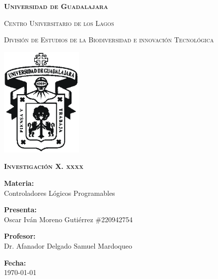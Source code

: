 \documentclass[12pt]{report}
\begin{document}
\setlength{\hoffset}{27 pt} %
\begin{titlepage}
{\centering
{\scshape\bfseries\fontsize{29.16}{34.992}\selectfont Universidad de Guadalajara \par}
\vspace{0.5cm}
{\scshape\Large Centro Universitario de los Lagos \par}
\vspace{1cm}
{\scshape\Large División de Estudios de la Biodiversidad e innovación Tecnológica \par}
\vspace{1cm}
{\graphicspath{{imagenes/Portada}} %
\includegraphics[width=0.3\textwidth]{image.png}\par}
\vspace{1cm}
{\scshape\large\bfseries Investigación X. xxxx \par}
\vspace{1.5cm}
{\large \textbf{Materia:} \\Controladores Lógicos Programables\par}
\vfill
{\large \textbf{Presenta:} \\Oscar Iván Moreno Gutiérrez \#220942754\par}
\vfill
{\large \textbf{Profesor:} \\Dr. Afanador Delgado Samuel Mardoqueo \par}
\vfill
\vfill
\begin{flushright}
  {\normalsize \textbf {Fecha:} \\ \today}
\end{flushright}
\vfill}
{\large  \par}
\end{titlepage}

\tableofcontents
\newpage

\end{document}
